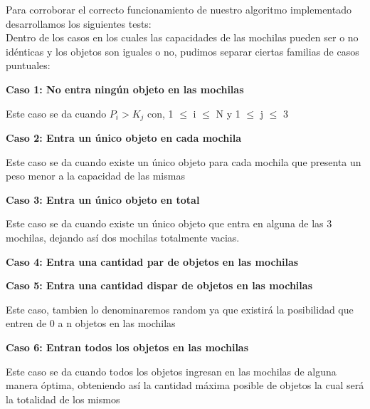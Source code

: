 \indent Para corroborar el correcto funcionamiento de nuestro algoritmo implementado desarrollamos los siguientes tests:\\

Dentro de los casos en los cuales las capacidades de las mochilas pueden ser o no id\'enticas y los objetos son iguales o no, pudimos separar ciertas familias de casos puntuales:\\

\begin{center}
\textbf{Caso 1: No entra ning\'un objeto en las mochilas}
\end{center}

Este caso se da cuando $P_{i} > K_{j}$ con, 1 $\leq$ i $\leq$ N y 1 $\leq$ j $\leq$ 3\\

\begin{center}
\textbf{Caso 2: Entra un \'unico objeto en cada mochila}

\end{center}

Este caso se da cuando existe un \'unico objeto para cada mochila que presenta un peso menor a la capacidad de las mismas

\begin{center}
\textbf{Caso 3: Entra un \'unico objeto en total}

\end{center}

Este caso se da cuando existe un \'unico objeto que entra en alguna de las 3 mochilas, dejando as\'i dos mochilas totalmente vacias.

\begin{center}
\textbf{Caso 4: Entra una cantidad par de objetos en las mochilas}

\end{center}

\begin{center}
\textbf{Caso 5: Entra una cantidad dispar de objetos en las mochilas}

\end{center}

Este caso, tambien lo denominaremos random ya que existir\'a la posibilidad que entren de 0 a n objetos en las mochilas

\begin{center}
\textbf{Caso 6: Entran todos los objetos en las mochilas}
\end{center}

Este caso se da cuando todos los objetos ingresan en las mochilas de alguna manera \'optima, obteniendo as\'i la cantidad m\'axima posible de objetos la cual ser\'a la totalidad de los mismos

